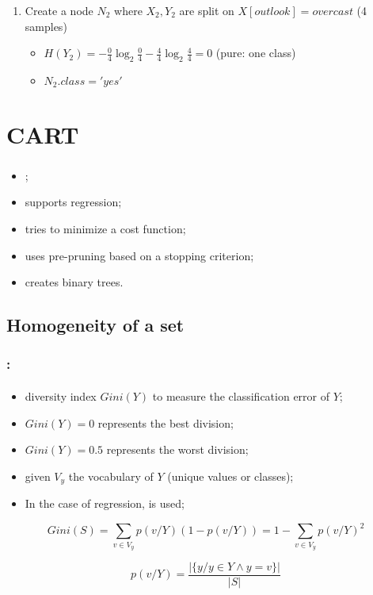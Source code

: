 \documentclass[xcolor=table]{beamer}
\begin{document}
\begin{frame}
\begin{enumerate}
		\item Create a node $ N_2 $ where $ X_2, Y_2 $ are split on $ X[outlook] = overcast$ (4 samples)
		\begin{itemize}\tiny\bfseries
			\item $ H(Y_2) = - \frac{0}{4} \log_2 \frac{0}{4} - \frac{4}{4} \log_2 \frac{4}{4} = 0$ (pure: one class)
			\item $ N_2.class = 'yes' $
		\end{itemize}
		
	\end{enumerate}
	
\end{frame}

\section{CART}

\begin{frame}
	\frametitle{\insertshortsubtitle}
	\framesubtitle{\insertsection}
	\begin{itemize}
		\item {};
		\item supports regression;
		\item tries to minimize a cost function;
		\item uses pre-pruning based on a stopping criterion;
		\item creates binary trees.
	\end{itemize}
	
\end{frame}

\subsection{Homogeneity of a set}

\begin{frame}
	\frametitle{\insertshortsubtitle: \insertsection}
	\framesubtitle{\insertsubsection}
	
	\begin{itemize}
		\item diversity index $Gini(Y)$ to measure the classification error of $Y$;
		\item $Gini(Y)=0$ represents the best division;
		\item $Gini(Y)=0.5$ represents the worst division;
		\item given $V_y$ the vocabulary of $Y$ (unique values or classes);
		\item In the case of regression,  is used;
	\end{itemize}
	
	\[Gini(S) = \sum\limits_{v \in V_y} p(v/Y) (1-p(v/Y)) = 1 - \sum\limits_{v \in V_y} p(v/Y)^2 \]
	
	\[p(v/Y) = \frac{|\{y / y \in Y \wedge y = v\}|}{|S|}\]
	
\end{frame}
\end{document}
